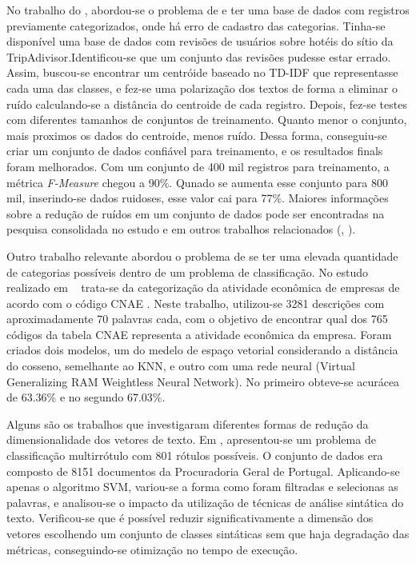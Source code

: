 
No trabalho do \cite{tripadivisor}, abordou-se o problema de e ter uma base de dados com registros previamente categorizados, onde há erro de cadastro das categorias. Tinha-se disponível uma base de dados com revisões de usuários sobre hotéis do sítio da TripAdivisor.Identificou-se que um conjunto das revisões pudesse estar errado. Assim, buscou-se encontrar um centróide baseado no TD-IDF que representasse cada uma das classes, e fez-se uma polarização dos textos de forma a eliminar o ruído calculando-se a distância do centroide de cada registro. Depois, fez-se testes com diferentes tamanhos de conjuntos de treinamento. Quanto menor o conjunto, mais proximos os dados do centroide, menos ruído. Dessa forma, conseguiu-se criar um conjunto de dados confiável para treinamento, e os resultados finals foram melhorados. Com um conjunto de 400 mil registros para treinamento, a métrica \textit{F-Measure }chegou a 90\%. Qunado se aumenta esse conjunto para 800 mil, inserindo-se dados ruidoses, esse valor cai para 77\%. Maiores informações sobre a redução de ruídos em um conjunto de dados pode ser encontradas na pesquisa consolidada no estudo \cite{mislabeled_survey} e em outros trabalhos relacionados (\cite{liu_preprocessing_2017}, \cite{svmop}).



Outro trabalho relevante abordou o problema de se ter uma elevada quantidade de categorias possíveis dentro de um problema de classificação. No estudo realizado em ~\cite{oliveira_intelligent_nodate} trata-se da categorização da atividade econômica de empresas de acordo com o código CNAE . Neste trabalho, utilizou-se 3281 descrições com aproximadamente 70 palavras cada, com o objetivo de encontrar qual dos 765 códigos da tabela CNAE representa a atividade econômica da empresa. Foram criados dois modelos, um do medelo de espaço vetorial considerando a distância do cosseno, semelhante ao KNN, e outro com uma rede neural (Virtual  Generalizing RAM Weightless Neural Network). No primeiro obteve-se acurácea de 63.36\% e no segundo 67.03\%.
\cite{mencia_efficient_2008}



Alguns são os trabalhos que investigaram diferentes formas de redução da dimensionalidade dos vetores de texto. Em \cite{goncalves_is_2005}, apresentou-se um problema de classificação multirrótulo com 801 rótulos possíveis. O conjunto de dados era composto de 8151 documentos da Procuradoria Geral de Portugal. Aplicando-se apenas o algoritmo SVM, variou-se a forma como foram filtradas e selecionas as palavras, e analisou-se o impacto da utilização de técnicas de análise sintática do texto. Verificou-se que é possível reduzir significativamente a dimensão dos vetores escolhendo um conjunto de classes sintáticas sem que haja degradação das métricas, conseguindo-se otimização no tempo de execução. 


